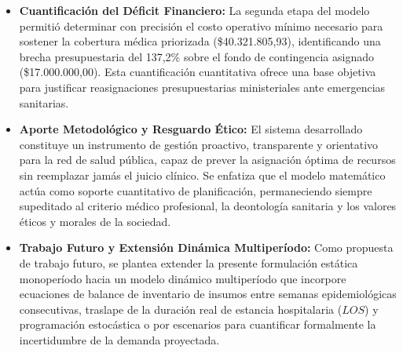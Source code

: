 \documentclass[conference]{IEEEtran}
\begin{document}
\begin{itemize}
    \item \textbf{Cuantificación del Déficit Financiero:} La segunda etapa del modelo permitió determinar con precisión el costo operativo mínimo necesario para sostener la cobertura médica priorizada (\$40.321.805,93), identificando una brecha presupuestaria del 137,2\% sobre el fondo de contingencia asignado (\$17.000.000,00). Esta cuantificación cuantitativa ofrece una base objetiva para justificar reasignaciones presupuestarias ministeriales ante emergencias sanitarias.
    \item \textbf{Aporte Metodológico y Resguardo Ético:} El sistema desarrollado constituye un instrumento de gestión proactivo, transparente y orientativo para la red de salud pública, capaz de prever la asignación óptima de recursos sin reemplazar jamás el juicio clínico. Se enfatiza que el modelo matemático actúa como soporte cuantitativo de planificación, permaneciendo siempre supeditado al criterio médico profesional, la deontología sanitaria y los valores éticos y morales de la sociedad.
    \item \textbf{Trabajo Futuro y Extensión Dinámica Multiperíodo:} Como propuesta de trabajo futuro, se plantea extender la presente formulación estática monoperíodo hacia un modelo dinámico multiperíodo que incorpore ecuaciones de balance de inventario de insumos entre semanas epidemiológicas consecutivas, traslape de la duración real de estancia hospitalaria ($LOS$) y programación estocástica o por escenarios para cuantificar formalmente la incertidumbre de la demanda proyectada.
\end{itemize}
\end{document}
